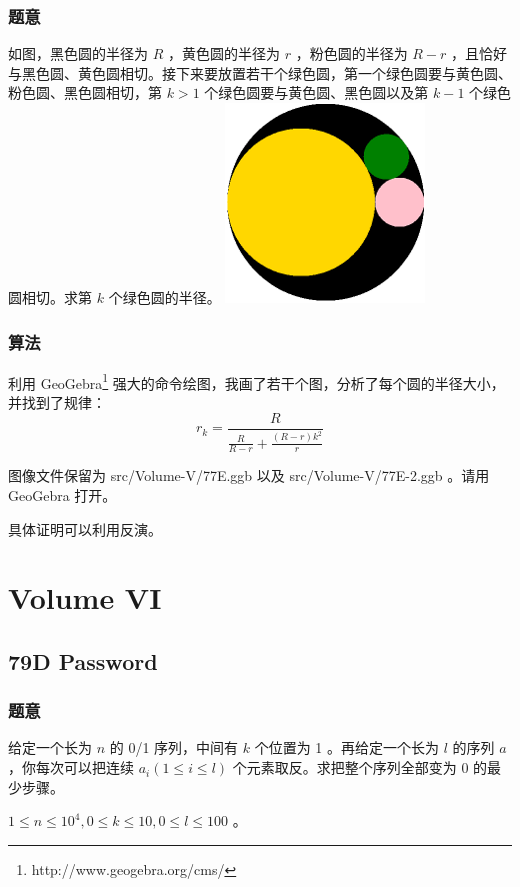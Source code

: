 \documentclass[11pt]{article}
\begin{document}
\subsubsection{题意}
\label{sec-5-9-1}

    如图，黑色圆的半径为 $R$ ，黄色圆的半径为 $r$ ，粉色圆的半径为 $R - r$ ，且恰好与黑色圆、黄色圆相切。接下来要放置若干个绿色圆，第一个绿色圆要与黄色圆、粉色圆、黑色圆相切，第 $k > 1$ 个绿色圆要与黄色圆、黑色圆以及第 $k - 1$ 个绿色圆相切。求第 $k$ 个绿色圆的半径。
\includegraphics{pic/77E.png}
\subsubsection{算法}
\label{sec-5-9-2}

    利用 GeoGebra\footnote{http://www.geogebra.org/cms/
 } 强大的命令绘图，我画了若干个图，分析了每个圆的半径大小，并找到了规律：
    $$r_k = \frac{R}{\frac{R}{R - r} + \frac{(R - r) k^2}{r}} $$

    图像文件保留为 src/Volume-V/77E.ggb 以及 src/Volume-V/77E-2.ggb 。请用 GeoGebra 打开。

    具体证明可以利用反演。
\section{Volume VI}
\label{sec-6}
\subsection{79D   Password}
\label{sec-6-1}
\subsubsection{题意}
\label{sec-6-1-1}

    给定一个长为 $n$ 的 0/1 序列，中间有 $k$ 个位置为 1 。再给定一个长为 $l$ 的序列 $a$ ，你每次可以把连续 $a_i (1 \leq i \leq l)$ 个元素取反。求把整个序列全部变为 0 的最少步骤。

    $1 \leq n \leq 10^4, 0 \leq k \leq 10, 0 \leq l \leq 100$ 。
\end{document}
